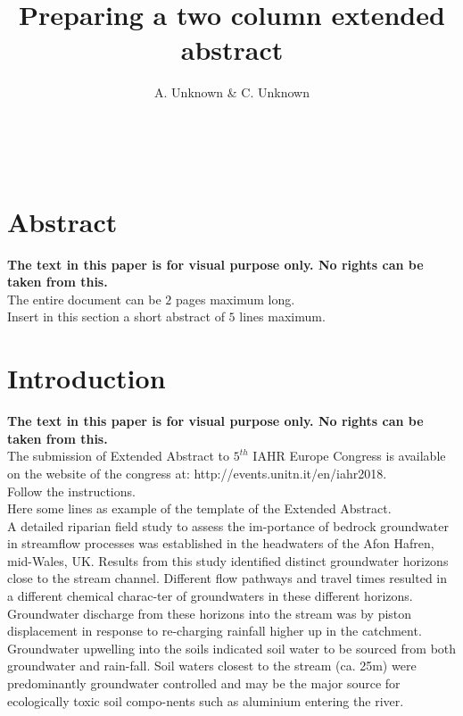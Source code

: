 \documentclass[12pt,a4paper,twocolumn,fleqn]{narms}
\begin{document}
\title{Preparing a two column extended abstract}
\author{{A. Unknown \& C. Unknown} \\
{} \\\\
{}\\
{}
} \maketitle


\section*{Abstract}

{\bf The text in this paper is for visual purpose only. No rights
can be taken from this.}\\
The entire document can be $2$ pages maximum long. \\
Insert in this section a short abstract of $5$ lines maximum.\\


\section{Introduction}

{\bf The text in this paper is for visual purpose only. No rights
can be taken from this.}\\

The submission of Extended Abstract to $5^{th}$ IAHR Europe Congress
is available on the website of the congress at: http://events.unitn.it/en/iahr2018.\\

Follow the instructions.\\

Here some lines as example of the template of the Extended Abstract.\\

A detailed riparian field study to assess the im-portance of
bedrock groundwater in streamflow processes was established in the
headwaters of the Afon Hafren, mid-Wales, UK. Results from this
study identified distinct groundwater horizons close to the stream
channel.  Different flow pathways and travel times resulted in a
different chemical charac-ter of groundwaters in these different
horizons.  Groundwater discharge from these horizons into the
stream was by piston displacement in response to re-charging
rainfall higher up in the catchment.  Groundwater upwelling into
the soils indicated soil water to be sourced from both groundwater
and rain-fall.  Soil waters closest to the stream (ca. 25m) were
predominantly groundwater controlled and may be the major source
for ecologically toxic soil compo-nents such as aluminium entering
the river.
\end{document}
